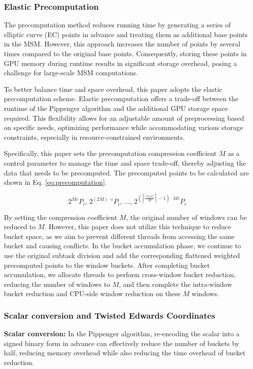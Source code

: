\documentclass[conference]{IEEEtran}
\begin{document}
\subsubsection{\textbf{Elastic Precomputation}}
The precomputation method reduces running time by generating a series of elliptic curve (EC) points in advance and treating them as additional base points in the MSM. However, this approach increases the number of points by several times compared to the original base points. Consequently, storing these points in GPU memory during runtime results in significant storage overhead, posing a challenge for large-scale MSM computations.

To better balance time and space overhead, this paper adopts the elastic precomputation scheme. Elastic precomputation offers a trade-off between the runtime of the Pippenger algorithm and the additional GPU storage space required. This flexibility allows for an adjustable amount of preprocessing based on specific needs, optimizing performance while accommodating various storage constraints, especially in resource-constrained environments.

Specifically, this paper sets the precomputation compression coefficient \( M \) as a control parameter to manage the time and space trade-off, thereby adjusting the data that needs to be precomputed. The precomputed points to be calculated are shown in Eq. \eqref{eq:precomputation}.

\begin{equation}
\label{eq:precomputation}
    2^{Mc} P_i, \, 2^{(2M) \cdot c} P_i, \, \ldots, \, 2^{\left(\left\lceil \frac{\lceil \lambda / c \rceil}{M} \right\rceil - 1\right) \cdot Mc} P_i
\end{equation}

By setting the compression coefficient $M$, the original number of windows can be reduced to $M$. However, this paper does not utilize this technique to reduce bucket space, as we aim to prevent different threads from accessing the same bucket and causing conflicts. In the bucket accumulation phase, we continue to use the original subtask division and add the corresponding flattened weighted precomputed points to the window buckets. After completing bucket accumulation, we allocate threads to perform cross-window bucket reduction, reducing the number of windows to $M$, and then complete the intra-window bucket reduction and CPU-side window reduction on these $M$ windows.


\subsubsection{\textbf{Scalar conversion and Twisted Edwards Coordinates}}
\textbf{Scalar conversion: } In the Pippenger algorithm, re-encoding the scalar into a signed binary form in advance can effectively reduce the number of buckets by half, reducing memory overhead while also reducing the time overhead of bucket reduction. 
\end{document}
